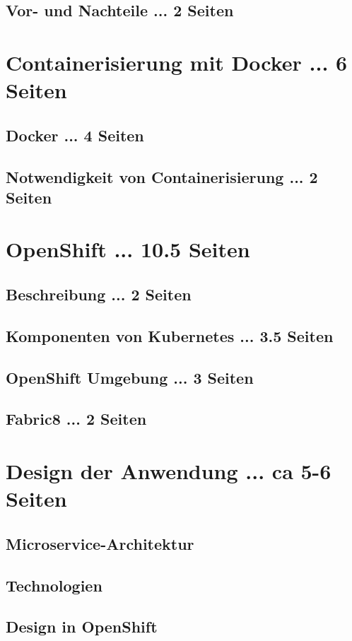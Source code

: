 \documentclass[master,german]{hgbthesis}
\begin{document}
\section{Vor- und Nachteile ... 2 Seiten}


\chapter{Containerisierung mit Docker ... 6 Seiten}
\section{Docker ... 4 Seiten}
\section{Notwendigkeit von Containerisierung ... 2 Seiten}


\chapter{OpenShift ... 10.5 Seiten}
\section{Beschreibung ... 2 Seiten}
\section{Komponenten von Kubernetes ... 3.5 Seiten}
\section{OpenShift Umgebung ... 3 Seiten}
\section{Fabric8 ... 2 Seiten}

\chapter{Design der Anwendung ... ca 5-6 Seiten}
\section{Microservice-Architektur}
\section{Technologien}
\section{Design in OpenShift}
\end{document}
